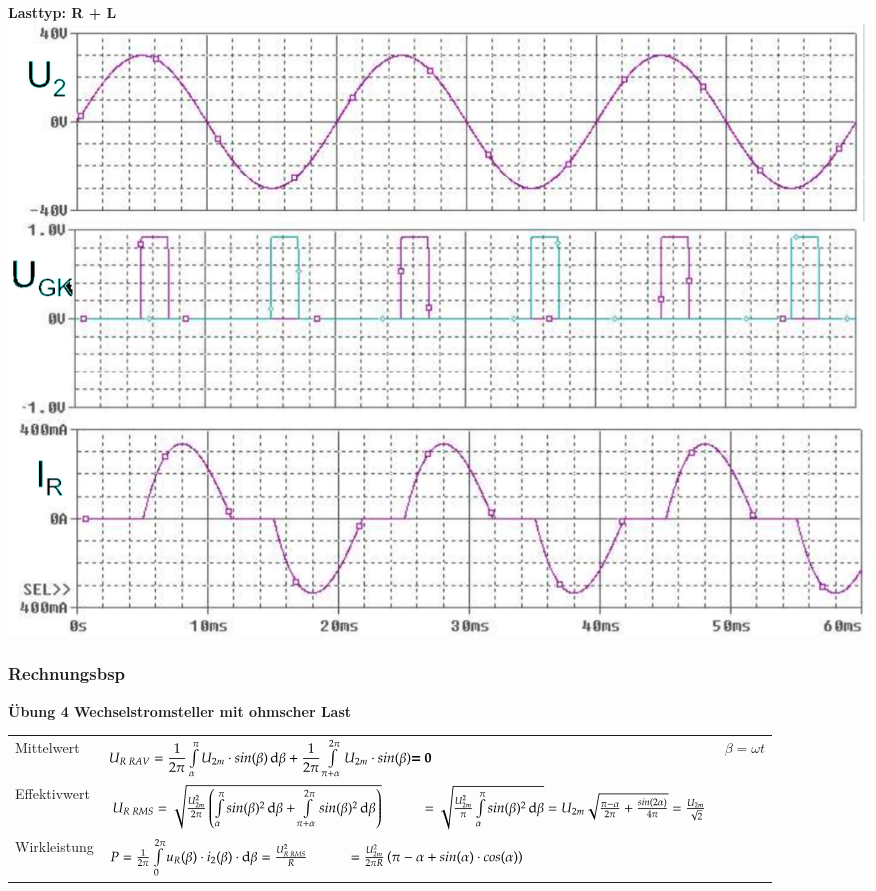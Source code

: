 \begin{minipage}{0.3\linewidth}
    \textbf{Lasttyp: R + L}\newline
    \includegraphics[width=\linewidth]{images/KLWSSteller2}
\end{minipage}


\subsubsection{Rechnungsbsp}
\textbf{Übung 4 Wechselstromsteller mit ohmscher Last}
\begin{longtable}{ p{}  p{}  p{} } %
    Mittelwert&
    $ {U}_{R\; RAV} = \dfrac{1}{2\pi} \int\limits_{\alpha}^{\pi}U_{2m}\cdot sin(\beta) \mathop{}\!\mathrm{d} \beta + \dfrac{1}{2\pi} \int\limits_{\pi +\alpha}^{2\pi}U_{2m}\cdot sin(\beta) \textbf{= 0} $ &
    $ \beta = \omega t $
    \\ 
    
    Effektivwert&
    $ U_{R\; RMS}= \sqrt{\frac{U_{2m}^2}{2\pi}\left( \int\limits_{\alpha}^{\pi} sin(\beta)^2 \diff \beta + \int\limits_{\pi +\alpha}^{2\pi} sin(\beta)^2 \diff \beta \right)} \newline
    \hspace*{1cm} =\sqrt{\frac{U_{2m}^2}{\pi}\int\limits_{\alpha}^{\pi} sin(\beta)^2 \diff\beta}
    = U_{2m}\sqrt{\frac{\pi - \alpha}{2 \pi}+ \frac{sin(2\alpha)}{4\pi}} = \frac{U_{2m}}{\sqrt{2}} $ &
    \\
    
    Wirkleistung&
    $ P = \frac{1}{2\pi}\int\limits_{0}^{2\pi} u_{R}(\beta)\cdot i_2(\beta)\cdot \diff \beta = \frac{U_{R\;RMS}^2}{R} \newline
     \hspace*{1cm} = \frac{U_{2m}^2}{2\pi R}\left(\pi - \alpha + sin(\alpha) \cdot cos(\alpha)\right)$& 
    \\
    
\end{longtable}

%    
\clearpage